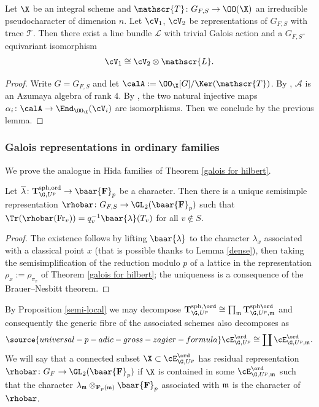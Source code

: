 \begin{lemm}\label{uniq}
Let $\X$ be an integral scheme and $\mathscr{T}\colon G_{F, S}\to \OO(\X)$ an irreducible pseudocharacter of dimension $n$. Let $\cV_{1}$, $\cV_{2}$ be representations of $G_{F,S} $ with trace $\mathscr{T}$. Then
  there exist    a  line bundle $\mathscr{L}$ with trivial Galois action and a $G_{F, S}$-equivariant isomorphism
 $$\cV_{1}\cong \cV_{2} \otimes \mathscr{L}.$$
\end{lemm}
\begin{proof}
Write $G=G_{F,S}$ and let $\calA:=\OO_{\X}[G]/\Ker(\mathscr{T})$. By \cite[Theorem 5.1]{rou}, $\mathscr{A}$ is an Azumaya algebra of rank $4$. By \cite[Corollary 2.9]{saltman},
the two natural injective maps $\alpha_{i}\colon \calA\to {\End}_{\OO_{\X}}(\cV_{i})$ are isomorphisms. Then we conclude by the previous lemma.
\end{proof}

\subsubsection{Galois representations in ordinary families} We prove the analogue in Hida families of Theorem \ref{galois for hilbert}.
\begin{lemm}\label{exist rhobar}
Let $\overline{\lambda}\colon {\bf T}_{\G, U^{p}}^{\rm sph,ord} \to \baar{\bf  F}_{p}$ be a character. Then there is a unique semisimple representation $\rhobar\colon G_{F,S}\to \GL_{2}(\baar{\bf F}_{p})$
such that $\Tr(\rhobar({\rm Fr}_{v}))=q_{v}^{-1}\baar{\lambda}(T_{v})$  for all $v\notin S$.
\end{lemm}
\begin{proof}
The existence follows by lifting $\baar{\lambda}$ to the character $\lambda_{x}$ associated with a classical point $x$ (that is possible thanks to Lemma \ref{dense}), then taking the semisimplification of the reduction modulo $p$ of a lattice in the representation  $\rho_{x}:=\rho_{\pi_{x}}$ of Theorem  \ref{galois for hilbert};   the uniqueness is a consequence of   the Brauer--Nesbitt theorem.
\end{proof}

By Proposition \ref{semi-local} we may decompose ${\bf T}_{\G, U^{p}}^{{\rm sph}, \ord}\cong
 \prod_{\mathfrak{m}}
 {\bf T}_{\G, U^{p}, \frak m}^{{\rm sph} \ord}$
 and consequently  the generic fibre of the associated schemes also decomposes as
\begin{align}\label{decomp}
\source{universal-p-adic-gross-zagier-formula}
\cE_{\G, U^{p}}^{\ord} \cong \coprod
\cE_{\G, U^{p}, \frak m}^{\ord}.
\end{align}
We will  say that a connected subset  $\X \subset \cE_{\G, U^{p}}^{\ord}$  has residual representation $\rhobar\colon G_{F}\to \GL_{2}(\baar{\bf F}_{p})$ if $\X$ is contained in some $\cE_{\G, U^{p}, \frak m}^{\ord}$ such that  the character $\lambda_{\frak m}\otimes_{{\bf F}_{p}(\frak m)}\baar{\bf F}_{p} $ associated with $\frak m$ is the character of $\rhobar$.


